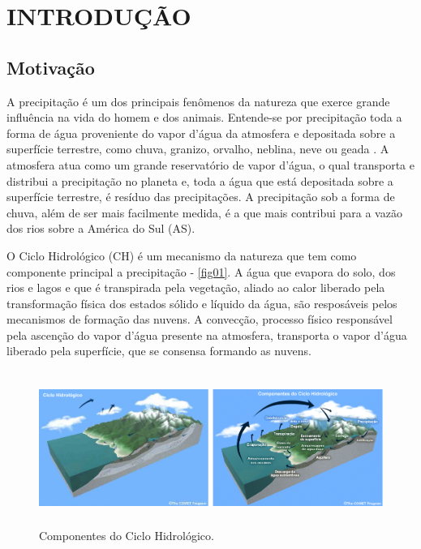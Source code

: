 \hypertarget{estilo:capitulo}{}
\chapter{INTRODUÇÃO} 

\section{Motivação}
\label{ss:motivacao}

A precipitação é um dos principais fenômenos da natureza que exerce grande influência na vida do homem e dos animais. Entende-se por precipitação toda a forma de água proveniente do vapor d'água da atmosfera e depositada sobre a superfície terrestre, como chuva, granizo, orvalho, neblina, neve ou geada \cite{pintoetal76}. A atmosfera atua como um grande reservatório de vapor d'água, o qual transporta e distribui a precipitação no planeta e, toda a água que está depositada sobre a superfície terrestre, é resíduo das precipitações. A precipitação sob a forma de chuva, além de ser mais facilmente medida, é a que mais contribui para a vazão dos rios sobre a América do Sul (AS).

O Ciclo Hidrológico (CH) é um mecanismo da natureza que tem como componente principal a precipitação - \autoref{fig01}. A água que evapora do solo, dos rios e lagos e que é transpirada pela vegetação, aliado ao calor liberado pela transformação física dos estados sólido e líquido da água, são resposáveis pelos mecanismos de formação das nuvens. A convecção, processo físico responsável pela ascenção do vapor d'água presente na atmosfera, transporta o vapor d'água liberado pela superfície, que se consensa formando as nuvens.

\begin{figure}[!hbp]
\centering
\includegraphics[height=5cm]{./figs/fig01.png}
\caption{Componentes do Ciclo Hidrológico.}
\label{fig01}
\end{figure}

